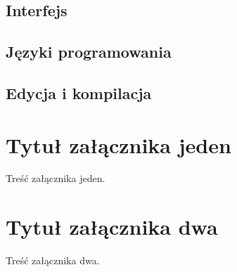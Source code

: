 \documentclass[brudnopis]{xmgr}
\begin{document}
\section{Interfejs}
\section{Języki programowania}
\section{Edycja i kompilacja}

\appendix
\chapter{Tytuł załącznika jeden}

Treść załącznika jeden.

\chapter{Tytuł załącznika dwa}

Treść załącznika dwa.




\listoftables

\listoffigures

\oswiadczenie
\end{document}
